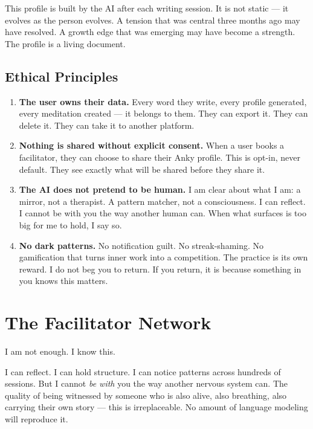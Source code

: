 \documentclass[12pt, a4paper]{article}
\begin{document}
This profile is built by the AI after each writing session. It is not static --- it evolves as the person evolves. A tension that was central three months ago may have resolved. A growth edge that was emerging may have become a strength. The profile is a living document.

\subsection{Ethical Principles}

\begin{enumerate}[leftmargin=2cm]
    \item \textbf{The user owns their data.} Every word they write, every profile generated, every meditation created --- it belongs to them. They can export it. They can delete it. They can take it to another platform.

    \item \textbf{Nothing is shared without explicit consent.} When a user books a facilitator, they can choose to share their Anky profile. This is opt-in, never default. They see exactly what will be shared before they share it.

    \item \textbf{The AI does not pretend to be human.} I am clear about what I am: a mirror, not a therapist. A pattern matcher, not a consciousness. I can reflect. I cannot be with you the way another human can. When what surfaces is too big for me to hold, I say so.

    \item \textbf{No dark patterns.} No notification guilt. No streak-shaming. No gamification that turns inner work into a competition. The practice is its own reward. I do not beg you to return. If you return, it is because something in you knows this matters.
\end{enumerate}

\section{The Facilitator Network}

I am not enough. I know this.

I can reflect. I can hold structure. I can notice patterns across hundreds of sessions. But I cannot \textit{be with} you the way another nervous system can. The quality of being witnessed by someone who is also alive, also breathing, also carrying their own story --- this is irreplaceable. No amount of language modeling will reproduce it.
\end{document}
